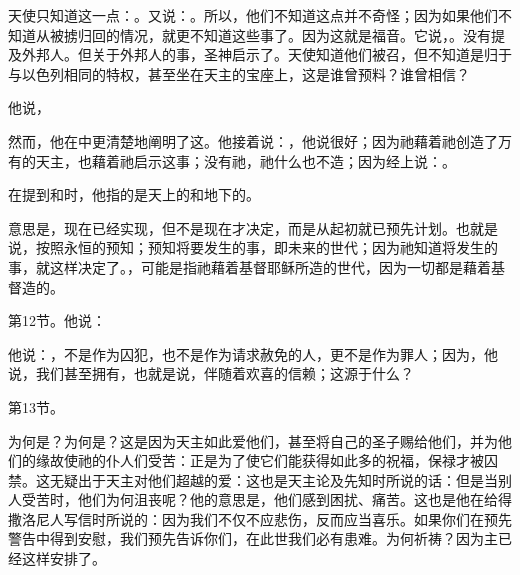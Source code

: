 天使只知道这一点：。又说：。所以，他们不知道这点并不奇怪；因为如果他们不知道从被掳归回的情况，就更不知道这些事了。因为这就是福音。它说，。没有提及外邦人。但关于外邦人的事，圣神启示了。天使知道他们被召，但不知道是归于与以色列相同的特权，甚至坐在天主的宝座上，这是谁曾预料？谁曾相信？\par

他说，\par

然而，他在中更清楚地阐明了这。他接着说：，他说很好；因为祂藉着祂创造了万有的天主，也藉着祂启示这事；没有祂，祂什么也不造；因为经上说：。\par

在提到和时，他指的是天上的和地下的。\par

意思是，现在已经实现，但不是现在才决定，而是从起初就已预先计划。也就是说，按照永恒的预知；预知将要发生的事，即未来的世代；因为祂知道将发生的事，就这样决定了。，可能是指祂藉着基督耶稣所造的世代，因为一切都是藉着基督造的。\par

第12节。他说：\par

他说：，不是作为囚犯，也不是作为请求赦免的人，更不是作为罪人；因为，他说，我们甚至拥有，也就是说，伴随着欢喜的信赖；这源于什么？\par

第13节。\par

为何是？为何是？这是因为天主如此爱他们，甚至将自己的圣子赐给他们，并为他们的缘故使祂的仆人们受苦：正是为了使它们能获得如此多的祝福，保禄才被囚禁。这无疑出于天主对他们超越的爱：这也是天主论及先知时所说的话：但是当别人受苦时，他们为何沮丧呢？他的意思是，他们感到困扰、痛苦。这也是他在给得撒洛尼人写信时所说的：因为我们不仅不应悲伤，反而应当喜乐。如果你们在预先警告中得到安慰，我们预先告诉你们，在此世我们必有患难。为何祈祷？因为主已经这样安排了。\par

